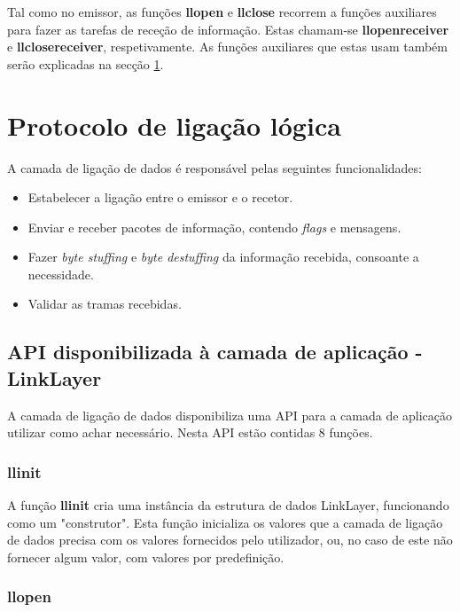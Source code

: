 \documentclass[11pt,a4paper,reqno]{article}
\numberwithin{equation}{section}
\begin{document}
\vspace{5mm}

Tal como no emissor, as funções \textbf{llopen} e \textbf{llclose} recorrem a funções auxiliares para fazer as tarefas de receção de informação. Estas chamam-se \textbf{llopen\textunderscore receiver} e \textbf{llclose\textunderscore receiver}, respetivamente. As funções auxiliares que estas usam também serão explicadas na secção \ref{sec:linklayer}.

\section{Protocolo de ligação lógica}
\label{sec:linklayer}

A camada de ligação de dados é responsável pelas seguintes funcionalidades:

\begin{itemize}
	\item Estabelecer a ligação entre o emissor e o recetor.
	\item Enviar e receber pacotes de informação, contendo \textit{flags} e mensagens.
	\item Fazer \textit{byte stuffing} e \textit{byte destuffing} da informação recebida, consoante a necessidade.
	\item Validar as tramas recebidas.
\end{itemize}

\subsection{API disponibilizada à camada de aplicação - LinkLayer}

A camada de ligação de dados disponibiliza uma API para a camada de aplicação utilizar como achar necessário. Nesta API estão contidas 8 funções.

\subsubsection{llinit}

A função \textbf{llinit} cria uma instância da estrutura de dados LinkLayer, funcionando como um "construtor". Esta função inicializa os valores que a camada de ligação de dados precisa com os valores fornecidos pelo utilizador, ou, no caso de este não fornecer algum valor, com valores por predefinição.

\subsubsection{llopen}
\end{document}
